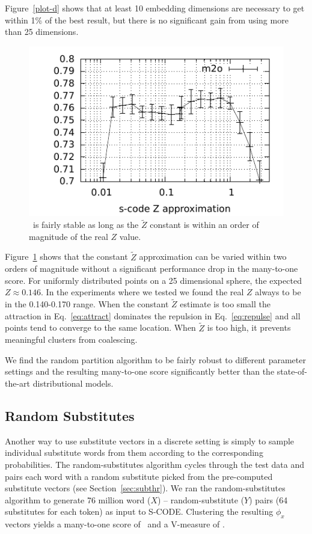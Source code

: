 Figure~\ref{plot-d} shows that at least 10 embedding dimensions are
necessary to get within 1\% of the best result, but there is no
significant gain from using more than 25 dimensions.

\begin{figure}[ht] \centering
\includegraphics[width=0.5\linewidth]{plot-z.pdf}
\caption{\mto\ is fairly stable as long as the $\tilde{Z}$ constant is
  within an order of magnitude of the real $Z$ value.}
\label{plot-z}
\end{figure}

Figure~\ref{plot-z} shows that the constant $\tilde{Z}$ approximation
can be varied within two orders of magnitude without a significant
performance drop in the many-to-one score.  For uniformly distributed
points on a 25 dimensional sphere, the expected $Z\approx 0.146$.  In
the experiments where we tested we found the real $Z$ always to be in
the 0.140-0.170 range.  When the constant $\tilde{Z}$ estimate is too
small the attraction in Eq.~\ref{eq:attract} dominates the repulsion
in Eq.~\ref{eq:repulse} and all points tend to converge to the same
location.  When $\tilde{Z}$ is too high, it prevents meaningful
clusters from coalescing.

We find the random partition algorithm to be fairly robust to
different parameter settings and the resulting many-to-one score
significantly better than the state-of-the-art distributional models.

\subsection{Random Substitutes}\label{sec:wordsub}

Another way to use substitute vectors in a discrete setting is simply
to sample individual substitute words from them according to the
corresponding probabilities.  The random-substitutes algorithm cycles
through the test data and pairs each word with a random substitute
picked from the pre-computed substitute vectors (see
Section~\ref{sec:subthr}).  We ran the random-substitutes algorithm to
generate 76 million word ($X$) -- random-substitute ($Y$) pairs (64
substitutes for each token) as input to S-CODE.  Clustering the
resulting $\phi_x$ vectors yields a many-to-one score of \wsmto\ and a
V-measure of \wsvm.

